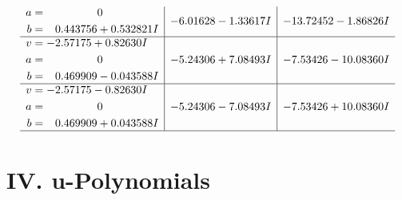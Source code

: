 \documentclass[1p]{elsarticle_modified}
\theoremstyle{definition}
\begin{document}
$$\begin{array}{c|c|c}
\begin{aligned}
a &= \phantom{-0.000000 } 0 \\
b &= \phantom{-}0.443756 + 0.532821 I\end{aligned}
 & -6.01628 - 1.33617 I & -13.72452 - 1.86826 I \\ \hline\begin{aligned}
v &= -2.57175 + 0.82630 I \\
a &= \phantom{-0.000000 } 0 \\
b &= \phantom{-}0.469909 - 0.043588 I\end{aligned}
 & -5.24306 + 7.08493 I & -7.53426 - 10.08360 I \\ \hline\begin{aligned}
v &= -2.57175 - 0.82630 I \\
a &= \phantom{-0.000000 } 0 \\
b &= \phantom{-}0.469909 + 0.043588 I\end{aligned}
 & -5.24306 - 7.08493 I & -7.53426 + 10.08360 I\\
 \hline 
 \end{array}$$\newpage
\newpage\renewcommand{\arraystretch}{1}
\centering \section*{ IV. u-Polynomials}
\end{document}
